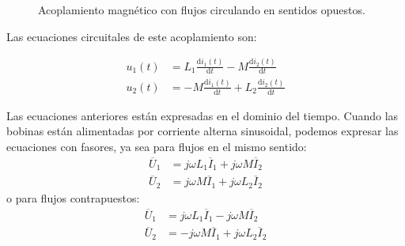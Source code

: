 \begin{figure}[H]
  \centering
  \hspace{1cm}
  \caption{Acoplamiento magnético con flujos circulando en sentidos opuestos.}
  \label{fig:acoplamiento-flujo-sentido_opuesto}
\end{figure}

Las ecuaciones circuitales de este acoplamiento son:

\begin{align*}
  u_1(t) &= L_1 \frac{\mathrm{d}i_1(t)}{\mathrm{d}t} - M \frac{\mathrm{d}i_2(t)}{\mathrm{d}t}\\
  u_2(t) &= - M \frac{\mathrm{d}i_1(t)}{\mathrm{d}t} + L_2 \frac{\mathrm{d}i_2(t)}{\mathrm{d}t}
\end{align*}

Las ecuaciones anteriores están expresadas en el dominio del
tiempo. Cuando las bobinas están alimentadas por corriente alterna
sinusoidal, podemos expresar las ecuaciones con fasores, ya sea para
flujos en el mismo sentido:
\begin{align*}
  \overline{U}_1 &= j \omega L_1 \overline{I}_1 + j \omega M \overline{I}_2\\
  \overline{U}_2 &= j \omega M \overline{I}_1 + j \omega L_2 \overline{I}_2
\end{align*}
o para flujos contrapuestos:
\begin{align*}
  \overline{U}_1 &= j \omega L_1 \overline{I}_1 - j \omega M \overline{I}_2\\
  \overline{U}_2 &= - j \omega M \overline{I}_1 + j \omega L_2 \overline{I}_2
\end{align*}


